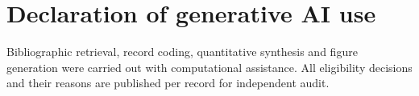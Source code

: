\documentclass[11pt,a4paper]{article}
\begin{document}
\section*{Declaration of generative AI use}
Bibliographic retrieval, record coding, quantitative synthesis and figure
generation were carried out with computational assistance. All eligibility
decisions and their reasons are published per record for independent audit.

\clearpage







\clearpage

\end{document}
